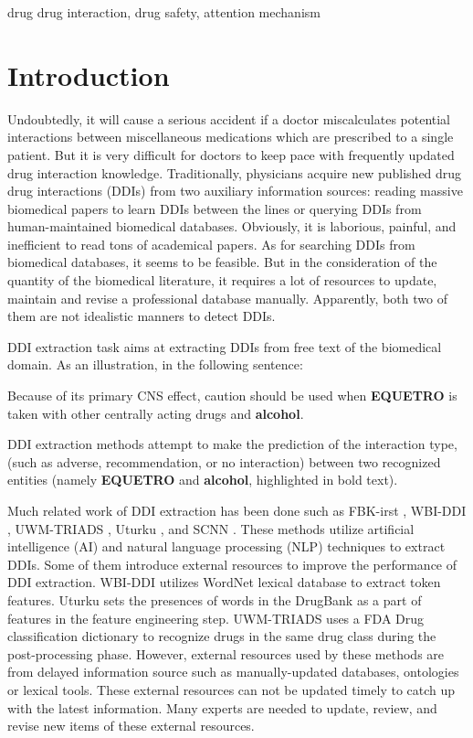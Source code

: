 \documentclass[conference]{IEEEtran}
\begin{document}
\begin{IEEEkeywords}
drug drug interaction, drug safety, attention mechanism
\end{IEEEkeywords}

\section{Introduction}
Undoubtedly, it will cause a serious accident if a doctor miscalculates 
potential interactions
between miscellaneous medications which are prescribed to a single patient.
But it is very difficult for doctors to keep pace with frequently updated 
drug interaction knowledge.
Traditionally, physicians acquire new published drug drug interactions (DDIs) 
from two auxiliary information sources:
reading massive biomedical papers to learn DDIs between the lines
or querying DDIs from human-maintained biomedical databases.
Obviously, it is laborious, painful,
and inefficient to read tons of academical papers.
As for searching DDIs from biomedical databases, it seems to be feasible.
But in the consideration of the quantity of the biomedical literature,
it requires a lot of resources to update, maintain and revise a professional database manually.
Apparently, both two of them are not idealistic manners to detect DDIs.

DDI extraction task aims at extracting DDIs from free text of the biomedical domain.
As an illustration, in the following sentence:

\begin{framed}
Because of its primary CNS effect, caution should be used when \textbf{EQUETRO}
is taken with other centrally acting drugs and \textbf{alcohol}.
\end{framed}

\noindent DDI extraction methods attempt to make the prediction of the interaction type,
(such as adverse, recommendation, or no interaction) between
two recognized entities (namely \textbf{EQUETRO} and \textbf{alcohol}, highlighted in bold text).

Much related work of DDI extraction has been done such as FBK-irst 
\cite{chowdhury_fbk-irst:_2013}, WBI-DDI \cite{thomas_wbi-ddi:_2013},
UWM-TRIADS \cite{rastegar-mojarad_uwm-triads:_2013},
Uturku \cite{bjorne_uturku:_2013}, 
and SCNN \cite{zhao_drug_2016}.
These methods utilize artificial intelligence (AI) and natural language processing (NLP) techniques to extract
DDIs.
Some of them introduce external resources to improve the performance of DDI extraction.
WBI-DDI utilizes WordNet lexical database to extract token features.
Uturku sets the presences of words in the DrugBank as a part of features in the 
feature engineering step.
UWM-TRIADS uses a FDA Drug classification dictionary to recognize drugs in the same
drug class during the post-processing phase.
However, external resources used by these methods are from delayed information source such 
as manually-updated databases, ontologies or lexical tools.
These external resources can not be updated timely to catch up with the latest
information.
Many experts are needed to update, review, and revise new items of these external resources.
\end{document}
